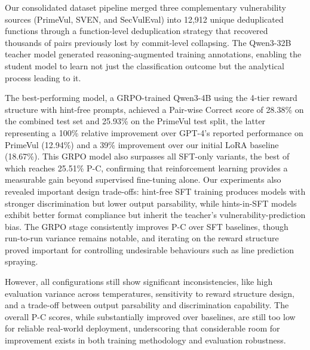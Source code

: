 \documentclass[12pt,a4paper]{article}
\begin{document}
Our consolidated dataset pipeline merged three complementary vulnerability sources (PrimeVul, SVEN, and SecVulEval) into 12,912 unique deduplicated functions through a function-level deduplication strategy that recovered thousands of pairs previously lost by commit-level collapsing. The Qwen3-32B teacher model generated reasoning-augmented training annotations, enabling the student model to learn not just the classification outcome but the analytical process leading to it.

The best-performing model, a GRPO-trained Qwen3-4B using the 4-tier reward structure with hint-free prompts, achieved a Pair-wise Correct score of 28.38\% on the combined test set and 25.93\% on the PrimeVul test split, the latter representing a 100\% relative improvement over GPT-4's reported performance on PrimeVul (12.94\%) and a 39\% improvement over our initial LoRA baseline (18.67\%). This GRPO model also surpasses all SFT-only variants, the best of which reaches 25.51\% P-C, confirming that reinforcement learning provides a measurable gain beyond supervised fine-tuning alone. Our experiments also revealed important design trade-offs: hint-free SFT training produces models with stronger discrimination but lower output parsability, while hints-in-SFT models exhibit better format compliance but inherit the teacher's vulnerability-prediction bias. The GRPO stage consistently improves P-C over SFT baselines, though run-to-run variance remains notable, and iterating on the reward structure proved important for controlling undesirable behaviours such as line prediction spraying.

However, all configurations still show significant inconsistencies, like high evaluation variance across temperatures, sensitivity to reward structure design, and a trade-off between output parsability and discrimination capability. The overall P-C scores, while substantially improved over baselines, are still too low for reliable real-world deployment, underscoring that considerable room for improvement exists in both training methodology and evaluation robustness.
\end{document}
